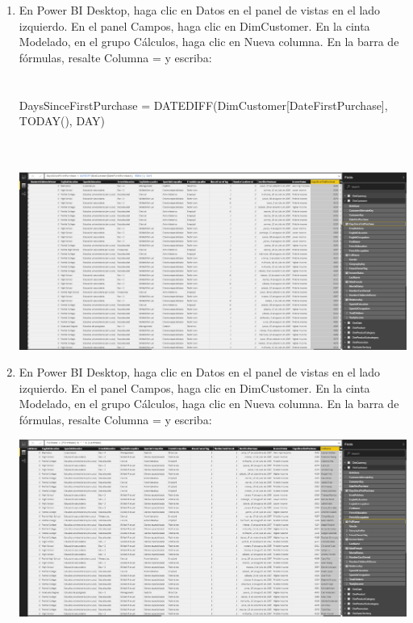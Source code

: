 \begin{enumerate}[1.]
	\item  En Power BI Desktop, haga clic en Datos en el panel de vistas en el lado izquierdo. En el panel Campos, haga clic en DimCustomer.  En la cinta Modelado, en el grupo Cálculos, haga clic en Nueva columna. En la barra de fórmulas, resalte Columna = y escriba:
	\\
	\\
	\\DaysSinceFirstPurchase = DATEDIFF(DimCustomer[DateFirstPurchase], TODAY(), DAY) \\
	\\
\\
	\begin{center}
	\includegraphics[width=17cm]{./Imagenes/32} 
	\end{center}


	\item En Power BI Desktop, haga clic en Datos en el panel de vistas en el lado izquierdo. En el panel Campos, haga clic en DimCustomer.  En la cinta Modelado, en el grupo Cálculos, haga clic en Nueva columna. En la barra de fórmulas, resalte Columna = y escriba:
	\\
	
			 
	\begin{center}
	\includegraphics[width=17cm]{./Imagenes/33} 
	\end{center}



\end{enumerate}
